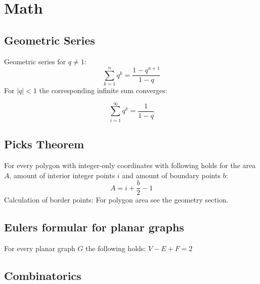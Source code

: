 \section{Math}

\subsection{Geometric Series}
Geometric series for $q \neq 1$:
\[
\sum\limits_{k=1}^n q^k = \frac{1-q^{n+1}}{1-q}
\]
For $\lvert q \rvert < 1$ the corresponding infinite sum converges:

\[
\sum_{i = 1}^{\infty} q^k = \frac{1}{1 - q}
\]

\subsection{Picks Theorem}
For every polygon with integer-only coordinates with following holds
for the area $A$, amount of interior integer points $i$ and amount of
boundary points $b$:
\[
A = i + \frac{b}{2} - 1
\]
Calculation of border points:
For polygon area see the geometry section.

\subsection{Eulers formular for planar graphs}
For every planar graph $G$ the following holds: $V - E + F = 2$

\subsection{Combinatorics}

